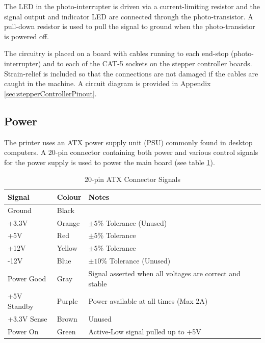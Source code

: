 			The LED in the photo-interrupter is driven via a current-limiting
			resistor and the signal output and indicator LED are connected through
			the photo-transistor. A pull-down resistor is used to pull the signal
			to ground when the photo-transistor is powered off.
			
			The circuitry is placed on a board with cables running to each end-stop
			(photo-interrupter) and to each of the CAT-5 sockets on the stepper
			controller boards. Strain-relief is included so that the connections are
			not damaged if the cables are caught in the machine. A circuit diagram
			is provided in Appendix \ref{sec:stepperControllerPinout}.
			
			
			
			
		\subsection{Power}
			
			The printer uses an ATX power supply unit (PSU) commonly found in
			desktop computers. A 20-pin connector containing both power and various
			control signals for the power supply is used to power the main board
			(see table \ref{tab:atxConnectors}).
			
			\begin{table}[here]
				\centering
				\begin{tabular}{l l l}
					\toprule
					Signal & Colour & Notes\\
					\midrule
					Ground & Black  & \\
					+3.3V  & Orange & $\pm5\%$  Tolerance (Unused) \\
					+5V    & Red    & $\pm5\%$  Tolerance \\
					+12V   & Yellow & $\pm5\%$  Tolerance \\
					-12V   & Blue   & $\pm10\%$ Tolerance (Unused) \\
					\addlinespace
					Power Good  & Gray   & Signal asserted when all voltages are correct
					                       and stable \\
					+5V Standby & Purple & Power available at all times (Max 2A) \\
					+3.3V Sense & Brown  & Unused \\
					Power On    & Green  & Active-Low signal pulled up to +5V \\
					
					\bottomrule
				\end{tabular}
				
				\caption{20-pin ATX Connector Signals\cite{ATX}}
				\label{tab:atxConnectors}
			\end{table}
			
